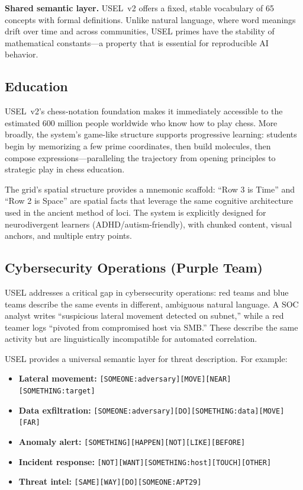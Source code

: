 \documentclass[11pt,a4paper]{article}
\begin{document}
\textbf{Shared semantic layer.} USEL~v2 offers a fixed, stable vocabulary of 65 concepts with formal definitions. Unlike natural language, where word meanings drift over time and across communities, USEL primes have the stability of mathematical constants---a property that is essential for reproducible AI behavior.

\subsection{Education}
\label{sec:education}

USEL~v2's chess-notation foundation makes it immediately accessible to the estimated 600 million people worldwide who know how to play chess. More broadly, the system's game-like structure supports progressive learning: students begin by memorizing a few prime coordinates, then build molecules, then compose expressions---paralleling the trajectory from opening principles to strategic play in chess education.

The grid's spatial structure provides a mnemonic scaffold: ``Row 3 is Time'' and ``Row 2 is Space'' are spatial facts that leverage the same cognitive architecture used in the ancient method of loci. The system is explicitly designed for neurodivergent learners (ADHD/autism-friendly), with chunked content, visual anchors, and multiple entry points.

\subsection{Cybersecurity Operations (Purple Team)}
\label{sec:cybersecurity}

USEL addresses a critical gap in cybersecurity operations: red teams and blue teams describe the same events in different, ambiguous natural language. A SOC analyst writes ``suspicious lateral movement detected on subnet,'' while a red teamer logs ``pivoted from compromised host via SMB.'' These describe the same activity but are linguistically incompatible for automated correlation.

USEL provides a universal semantic layer for threat description. For example:

\begin{itemize}
  \item \textbf{Lateral movement:} \texttt{[SOMEONE:adversary][MOVE][NEAR][SOMETHING:target]}
  \item \textbf{Data exfiltration:} \texttt{[SOMEONE:adversary][DO][SOMETHING:data][MOVE][FAR]}
  \item \textbf{Anomaly alert:} \texttt{[SOMETHING][HAPPEN][NOT][LIKE][BEFORE]}
  \item \textbf{Incident response:} \texttt{[NOT][WANT][SOMETHING:host][TOUCH][OTHER]}
  \item \textbf{Threat intel:} \texttt{[SAME][WAY][DO][SOMEONE:APT29]}
\end{itemize}
\end{document}
